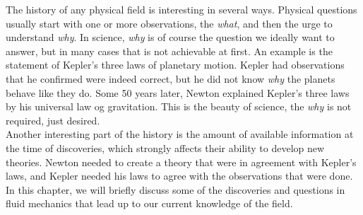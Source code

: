 The history of any physical field is interesting in several ways. Physical questions usually start with one or more observations, the \textit{what}, and then the urge to understand \textit{why}. In science, \textit{why} is of course the question we ideally want to answer, but in many cases that is not achievable at first. An example is the statement of Kepler's three laws of planetary motion. Kepler had observations that he confirmed were indeed correct, but he did not know \textit{why} the planets behave like they do. Some 50 years later, Newton explained Kepler's three laws by his universal law og gravitation. This is the beauty of science, the \textit{why} is not required, just desired.\\
Another interesting part of the history is the amount of available information at the time of discoveries, which strongly affects their ability to develop new theories. Newton needed to create a theory that were in agreement with Kepler's laws, and Kepler needed his laws to agree with the observations that were done. In this chapter, we will briefly discuss some of the discoveries and questions in fluid mechanics that lead up to our current knowledge of the field. 
